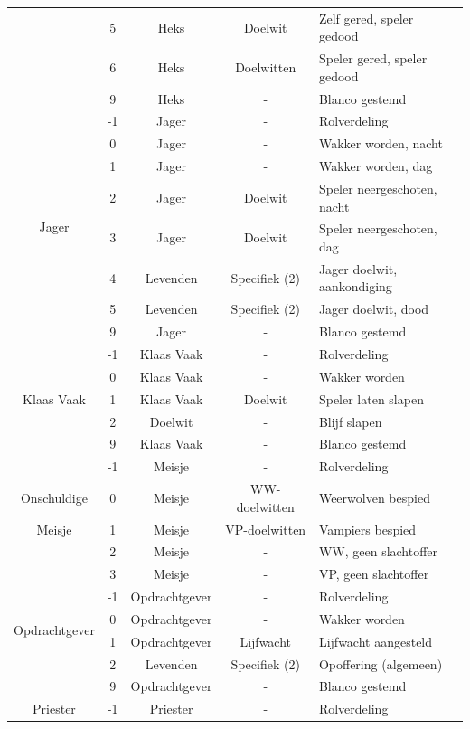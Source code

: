 \documentclass[12pt]{article}
\begin{document}
\begin{center}
\begin{longtable}{c|c|c|c|l}
       & 5 & Heks & Doelwit & Zelf gered, speler gedood \\
       & 6 & Heks & Doelwitten & Speler gered, speler gedood \\
       & 9 & Heks & - & Blanco gestemd \\
      \hline
      \multirow{8}{*}{Jager} & -1 & Jager & - & Rolverdeling \\
       & 0 & Jager & - & Wakker worden, nacht \\
       & 1 & Jager & - & Wakker worden, dag \\
       & 2 & Jager & Doelwit & Speler neergeschoten, nacht \\
       & 3 & Jager & Doelwit & Speler neergeschoten, dag \\
       & 4 & Levenden & Specifiek (2) & Jager doelwit, aankondiging \\
       & 5 & Levenden & Specifiek (2) & Jager doelwit, dood \\
       & 9 & Jager & - & Blanco gestemd \\
      \hline
      \multirow{5}{*}{Klaas Vaak} & -1 & Klaas Vaak & - & Rolverdeling \\
       & 0 & Klaas Vaak & - & Wakker worden \\
       & 1 & Klaas Vaak & Doelwit & Speler laten slapen \\
       & 2 & Doelwit & - & Blijf slapen \\
       & 9 & Klaas Vaak & - & Blanco gestemd \\
      \hline
       & -1 & Meisje & - & Rolverdeling \\
      Onschuldige & 0 & Meisje & WW-doelwitten & Weerwolven bespied \\
      Meisje & 1 & Meisje & VP-doelwitten & Vampiers bespied \\
       & 2 & Meisje & - & WW, geen slachtoffer \\
       & 3 & Meisje & - & VP, geen slachtoffer \\
      \hline
      \multirow{4}{*}{Opdrachtgever} & -1 & Opdrachtgever & - & Rolverdeling \\
       & 0 & Opdrachtgever & - & Wakker worden \\
       & 1 & Opdrachtgever & Lijfwacht & Lijfwacht aangesteld \\
       & 2 & Levenden & Specifiek (2) & Opoffering (algemeen) \\
       & 9 & Opdrachtgever & - & Blanco gestemd \\
      \hline
      \multirow{5}{*}{Priester} & -1 & Priester & - & Rolverdeling \\

\end{longtable}
\end{center}
\end{document}
